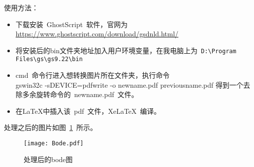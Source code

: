 使用方法：

\begin{itemize}
    \item 下载安装~GhostScript~软件，官网为\url{https://www.ghostscript.com/download/gsdnld.html/}
        
    \item 将安装后的bin文件夹地址加入用户环境变量，在我电脑上为~\verb|D:|\verb|\Program Files|\verb|\gs|\verb|\gs9.22|\verb|\bin|
	
    \item cmd~命令行进入想转换图片所在文件夹，执行命令\\gswin32c -sDEVICE=pdfwrite -o newname.pdf  previousname.pdf
              得到一个去除多余旋转命令的~newname.pdf~文件。

    \item 在\LaTeX{}中插入该~pdf~文件，XeLaTeX~编译。
\end{itemize}

处理之后的图片如图~\ref{Bode}~所示。
\begin{figure}[H] 
  \centering
  \texttt{[image: Bode.pdf]}
  \caption{处理后的bode图}
  \label{Bode}
\end{figure}






